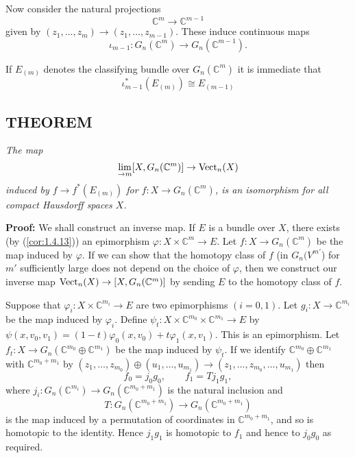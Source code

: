 Now consider the natural projections
\begin{equation*}
    \mathbb{C}^m \to \mathbb{C}^{m-1}
\end{equation*}
given by $(z_1, \ldots, z_m) \to (z_1, \ldots, z_{m-1})$. These induce continuous maps
\begin{equation*}
    \iota_{m-1}: G_n(\mathbb{C}^m) \to G_n(\mathbb{C}^{m-1}).
\end{equation*}

If $E_{(m)}$ denotes the classifying bundle over $G_n(\mathbb{C}^m)$ it is
immediate that
\begin{equation*}
    \iota_{m-1}^*(E_{(m)}) \cong E_{(m-1)}
\end{equation*}

\subsection{THEOREM}\label{the:1.4.15} \textit{The map}
\begin{equation*}
    \lim_{\to m} [X, G_n(\mathbb{C}^m)] \to \operatorname{Vect}_n(X)
\end{equation*}
\textit{induced by $f \to f^*(E_{(m)})$ for $f: X \to G_n(\mathbb{C}^m)$, is an isomorphism for all compact Hausdorff spaces $X$.}

\textbf{Proof:} We shall construct an inverse map. If $E$ is a bundle over $X$, there exists (by (\ref{cor:1.4.13})) an epimorphism $\varphi: X \times \mathbb{C}^m \to E$. Let $f: X \to G_n(\mathbb{C}^m)$ be the map induced by $\varphi$. If we can show that the homotopy class of $f$ (in $G_n(V^{m'}$) for $m'$ sufficiently large does not depend on the choice of $\varphi$, then we construct our inverse map $\operatorname{Vect}_n(X) \to [X, G_n(\mathbb{C}^m)]$ by sending $E$ to the homotopy class of $f$. \par 

Suppose that $\varphi_i: X \times \mathbb{C}^{m_i} \to E$ are two epimorphisms $(i = 0, 1)$. Let $g_i: X \to \mathbb{C}^{m_i}$ be the map induced by $\varphi_i$. Define $\psi_t: X \times \mathbb{C}^{m_0} \times \mathbb{C}^{m_1} \to E$ by $\psi(x, v_0, v_1) = (1-t) \varphi_0(x, v_0) + t\varphi_1(x, v_1)$. This is an epimorphism. Let $f_t: X \to G_n(\mathbb{C}^{m_0} \oplus \mathbb{C}^{m_1})$ be the map induced by $\psi_t$. If we identify $\mathbb{C}^{m_0} \oplus \mathbb{C}^{m_1}$ with $\mathbb{C}^{m_0 + m_1}$ by $(z_1, \ldots, z_{m_0}) \oplus (u_1, \ldots, u_{m_1}) \to (z_1, \ldots, z_{m_0}, \ldots, u_{m_1})$ then
\begin{equation*}
    f_0 = j_0 g_0, \qquad f_1 = T j_1 g_1,
\end{equation*}
where $j_i: G_n(\mathbb{C}^{m_i}) \to G_n(\mathbb{C}^{m_0 + m_1})$ is the natural inclusion and
\begin{equation*}
    T: G_n(\mathbb{C}^{m_0 + m_1}) \to G_n(\mathbb{C}^{m_0 + m_1})
\end{equation*}
is the map induced by a permutation of coordinates in $\mathbb{C}^{m_0 + m_1}$, and so is homotopic to the identity. Hence $j_1 g_1$ is homotopic to $f_1$ and hence to $j_0 g_0$ as required. \par \hfill

